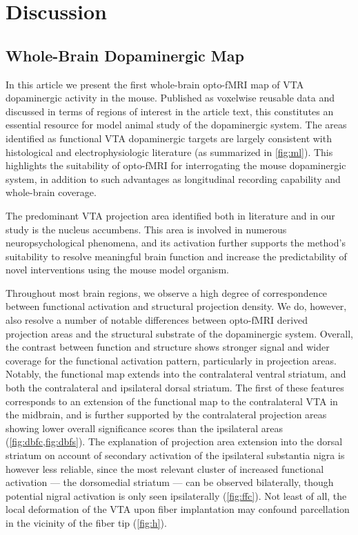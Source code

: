 \section{Discussion}

\subsection{Whole-Brain Dopaminergic Map}

In this article we present the first whole-brain opto-fMRI map of VTA dopaminergic activity in the mouse.
Published as voxelwise reusable data and discussed in terms of regions of interest in the article text, this constitutes an essential resource for model animal study of the dopaminergic system.
The areas identified as functional VTA dopaminergic targets are largely consistent with histological and electrophysiologic literature (as summarized in \cref{fig:ml}).
This highlights the suitability of opto-fMRI for interrogating the mouse dopaminergic system, in addition to such advantages as longitudinal recording capability and whole-brain coverage.

The predominant VTA projection area identified both in literature and in our study is the nucleus accumbens.
This area is involved in numerous neuropsychological phenomena, and its activation further supports the method's suitability to resolve meaningful brain function and increase the predictability of novel interventions using the mouse model organism.

Throughout most brain regions, we observe a high degree of correspondence between functional activation and structural projection density.
We do, however, also resolve a number of notable differences between opto-fMRI derived projection areas and the structural substrate of the dopaminergic system.
Overall, the contrast between function and structure shows stronger signal and wider coverage for the functional activation pattern, particularly in projection areas.
Notably, the functional map extends into the contralateral ventral striatum, and both the contralateral and ipsilateral dorsal striatum.
The first of these features corresponds to an extension of the functional map to the contralateral VTA in the midbrain, and is further supported by the contralateral projection areas showing lower overall significance scores than the ipsilateral areas (\cref{fig:dbfc,fig:dbfs}).
The explanation of projection area extension into the dorsal striatum on account of secondary activation of the ipsilateral substantia nigra is however less reliable, since the most relevant cluster of increased functional activation --- the dorsomedial striatum --- can be observed bilaterally, though potential nigral activation is only seen ipsilaterally (\cref{fig:ffc}).
Not least of all, the local deformation of the VTA upon fiber implantation may confound parcellation in the vicinity of the fiber tip (\cref{fig:h}).

